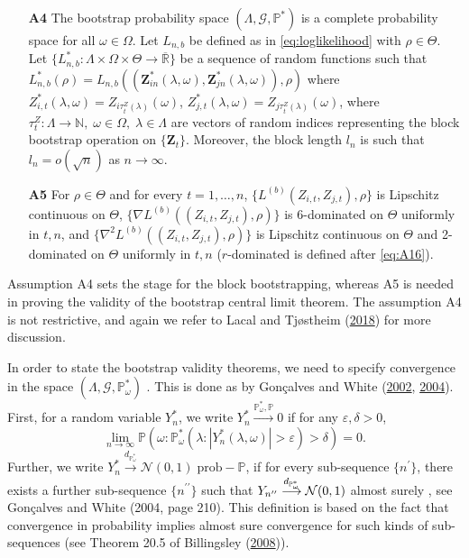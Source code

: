\documentclass[
  12pt,
  letterpaper]{article}
\numberwithin{equation}{section}
\newcommand{\Z}{\bm{Z}}
\begin{document}
\begin{itemize}
\item[\textbf{A4}] The bootstrap probability space $(\Lambda, \mathcal{G}, \mathbb{P}^*)$ is a complete probability space for all $\omega \in \Omega$. Let $L_{n,b}$ be defined as in \eqref{eq:loglikelihood} with $\rho \in \Theta$. Let $\{L^*_{n,b}: \Lambda\times\Omega\times\Theta \rightarrow \overline{\mathbb{R}}\}$ be a sequence of random functions such that $L_{n,b}^*(\rho) = L_{n,b}((\Z_{in}^{*}(\lambda,\omega),\Z_{jn}^*(\lambda,\omega)),\rho)$ where $Z_{i,t}^*(\lambda,\omega) = Z_{i\tau_t^{Z}(\lambda)}(\omega)$, $Z_{j,t}^*(\lambda,\omega)= Z_{j\tau_t^{Z}(\lambda)}(\omega)$, where $\tau_t^{Z}: \Lambda \to \mathbb{N},\; \omega \in \Omega, \; \lambda \in \Lambda$ are vectors of random indices representing the block bootstrap operation on $\{\Z_t\}$. Moreover, the block length $l_n$ is such that $l_n=o(\sqrt{n})$ as $n \to \infty$. 
\item[\textbf{A5}] For $\rho \in \Theta$ and for every $t=1,\ldots,n$, $\{L^{(b)}(Z_{i,t},Z_{j,t}),\rho\}$ is Lipschitz continuous on $\Theta$, $\{\nabla L^{(b)}((Z_{i,t},Z_{j,t}),\rho)\}$ is 6-dominated  on $\Theta$ uniformly in $t,n$, and $\{\nabla^2 L^{(b)}((Z_{i,t},Z_{j,t}),\rho)\}$ is Lipschitz continuous on $\Theta$ and 2-dominated on $\Theta$ uniformly in $t,n$ ($r$-dominated is defined after \eqref{eq:A16}).
\end{itemize}

Assumption A4 sets the stage for the block bootstrapping, whereas A5 is needed in proving the validity of the bootstrap central limit theorem. The assumption A4 is not restrictive, and again we refer to Lacal and Tjøstheim (\protect\hyperlink{ref-lacal2018estimating}{2018}) for more discussion.

In order to state the bootstrap validity theorems, we need to specify convergence in the space \((\Lambda, {\mathcal G}, \mathbb{P}_{\omega}^*)\) . This is done as by Gon\c{c}alves and White (\protect\hyperlink{ref-gonccalves2002bootstrap}{2002}, \protect\hyperlink{ref-gonccalves2004maximum}{2004}). First, for a random variable \(Y_n^*\), we write \(Y_n^* \stackrel {\mathbb{P}_{\omega}^*,\mathbb{P}}{\rightarrow} 0\) if for any \(\varepsilon, \delta > 0\),
\[
\lim_{n \to \infty} \mathbb{P}(\omega:\mathbb{P}_{\omega}^*(\lambda:|Y_n^*(\lambda,\omega)| > \varepsilon) > \delta) = 0.
\]
Further, we write \(Y_n^* \stackrel {d_{\mathbb{P}_{\omega}^*}}{\longrightarrow} {\mathcal N}(0,1)\;\mbox{prob}-\mathbb{P}\), if for every sub-sequence \(\{n^{\prime}\}\), there exists a further sub-sequence \(\{n^{\prime \prime}\}\) such that \(Y_{n^{\prime \prime}} \stackrel {d_{\mathbb{P}_{\omega}^{*}}} {\longrightarrow} {\cal N}(0,1)\) almost surely , see Gon\c{c}alves and White (2004, page 210). This definition is based on the fact that convergence in probability implies almost sure convergence for such kinds of sub-sequences (see Theorem 20.5 of Billingsley (\protect\hyperlink{ref-bill:2008}{2008})).
\end{document}
